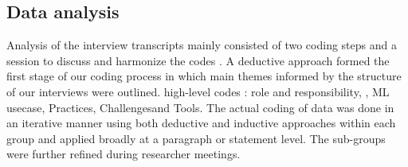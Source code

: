 \subsection{Data analysis}
Analysis of the interview transcripts mainly consisted of two coding steps and a session to discuss and harmonize the codes \cite{Runeson2008}. A deductive approach formed the first stage of our coding process in which main themes informed by the structure of our interviews were outlined. %
\DIFdelbegin {}\DIFdelend \DIFaddbegin {}\DIFaddend high-level codes \DIFdelbegin {}\DIFdelend \DIFaddbegin {}\DIFaddend : role and responsibility, \DIFdelbegin {}\DIFdelend \DIFaddbegin {}\DIFaddend , ML usecase, Practices, Challenges\DIFaddbegin \DIFadd{, }\DIFaddend and Tools. The actual coding of data was done in an iterative manner using both deductive and inductive \cite{Runeson2008} approaches within each group and applied broadly at a paragraph or statement level. The sub-groups were further refined during researcher meetings.
 \DIFaddbegin 

 \DIFaddend